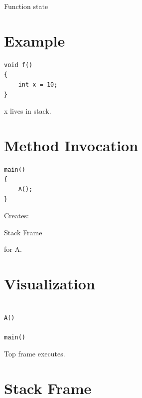 \documentclass[11pt,a4paper]{book}
\begin{document}
Function state


\section{Example}

\begin{verbatim} 
void f()
{
    int x = 10;
}
\end{verbatim}


x lives in stack.


\section{Method Invocation}

\begin{verbatim} 
main()
{
    A();
}
\end{verbatim}


Creates:


Stack Frame


for A.


\section{Visualization}

\begin{verbatim}

A()

main()

\end{verbatim}


Top frame executes.


\section{Stack Frame}
\end{document}
